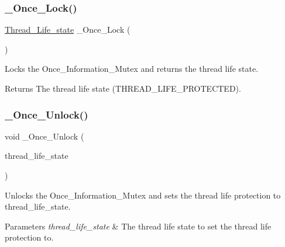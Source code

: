 \subsubsection{\texorpdfstring{\_Once\_Lock()}{\_Once\_Lock()}}
{\footnotesize\ttfamily \mbox{\hyperlink{group__RTEMSScoreThread_ga0b4c61e432a0c21855e3122bb394583d}{Thread\+\_\+\+Life\+\_\+state}} \+\_\+\+Once\+\_\+\+Lock (\begin{DoxyParamCaption}\item[{void}]{ }\end{DoxyParamCaption})}



Locks the Once\+\_\+\+Information\+\_\+\+Mutex and returns the thread life state. 

\begin{DoxyReturn}{Returns}
The thread life state (T\+H\+R\+E\+A\+D\+\_\+\+L\+I\+F\+E\+\_\+\+P\+R\+O\+T\+E\+C\+T\+ED). 
\end{DoxyReturn}
\mbox{\label{group__RTEMSScoreOnce_ga740a7de5e233c0d39a774f93c5e27b6e}} 
\subsubsection{\texorpdfstring{\_Once\_Unlock()}{\_Once\_Unlock()}}
{\footnotesize\ttfamily void \+\_\+\+Once\+\_\+\+Unlock (\begin{DoxyParamCaption}\item[{\mbox{\hyperlink{group__RTEMSScoreThread_ga0b4c61e432a0c21855e3122bb394583d}{Thread\+\_\+\+Life\+\_\+state}}}]{thread\+\_\+life\+\_\+state }\end{DoxyParamCaption})}



Unlocks the Once\+\_\+\+Information\+\_\+\+Mutex and sets the thread life protection to thread\+\_\+life\+\_\+state. 


\begin{DoxyParams}{Parameters}
{\em thread\+\_\+life\+\_\+state} & The thread life state to set the thread life protection to. \\
\hline
\end{DoxyParams}
